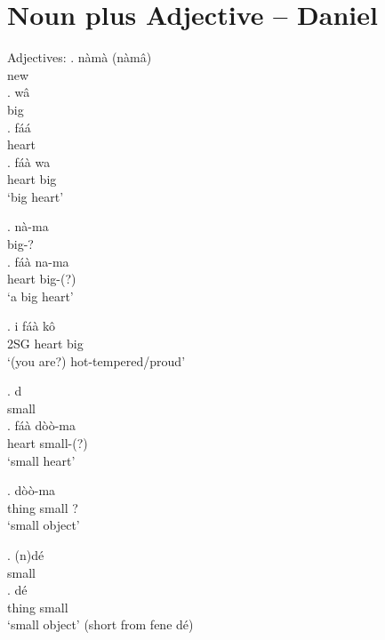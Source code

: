 \documentclass{assets/fieldnotes}
\newcommand{\mb}[1]{\textcolor{Dandelion}{#1}}
\begin{document}


\section{Noun plus Adjective -- Daniel} %



Adjectives:
\exg. nàmà (nàmâ)\\
new\\

\exg. wâ\\
big\\

\ex. fáá\\
heart\\

\exg. fáà wa\\
heart big\\
`big heart'

\exg. nà-ma\\
big-?\\

\exg. fáà na-ma\\
heart big-(?)\\
`a big heart'

\exg. i fáà kô\\
2SG heart big\\
`(you are?) hot-tempered/proud'

\exg. d\\
small\\

\exg. fáà dòò-ma\\
heart small-(?)\\
`small heart'

\exg.  dòò-ma\\
thing small ?\\
`small object'

\exg. (n)dé\\
small\\

\exg.  dé\\
thing small\\
`small object' (short from fene dé)
\end{document}
